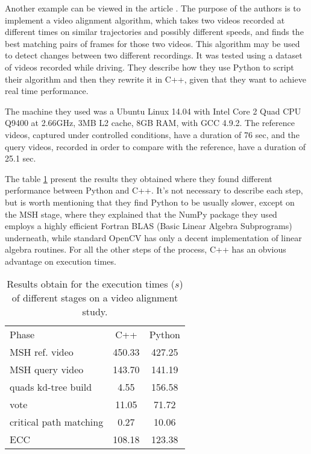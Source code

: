 \documentclass[10pt,letterpaper]{article}
\begin{document}
Another example can be viewed in the article \cite{Susu2016}. The purpose of the authors is to implement a video alignment algorithm, which takes two videos recorded at different times on similar trajectories and possibly different speeds, and finds the best matching pairs of frames for those two videos. This algorithm may be used to detect changes between two different recordings. It was tested using a dataset of videos recorded while driving. They describe how they use Python to script their algorithm and then they rewrite it in C++, given that they want to achieve real time performance.

The machine they used was a Ubuntu Linux 14.04 with Intel Core 2 Quad CPU Q9400 at 2.66GHz, 3MB L2 cache, 8GB RAM, with GCC 4.9.2. The reference videos, captured under controlled conditions, have a duration of 76 sec, and the query videos, recorded in order to compare with the reference, have a duration of 25.1 sec.

The table \ref{videotable} present the results they obtained where they found different performance between Python and C++. It's not necessary to describe each step, but is worth mentioning that they find Python to be usually slower, except on the MSH stage, where they explained that the NumPy package they used employs a highly efficient Fortran BLAS (Basic Linear Algebra Subprograms) underneath, while standard OpenCV has only a decent implementation of linear algebra routines. For all the other steps of the process, C++ has an obvious advantage on execution times.

\begin{table}
\centering
\begin{tabular}{@{}l|cc@{}} \toprule
	Phase & C++ & Python \\ \cmidrule(r){1-3}
	MSH ref. video & 450.33 & 427.25\\
	MSH query video & 143.70 & 141.19\\
	quads kd-tree build & 4.55 & 156.58\\
	vote & 11.05 & 71.72\\
	critical path matching & 0.27 & 10.06\\
	ECC & 108.18 & 123.38\\ \bottomrule
\end{tabular}
\caption{Results obtain for the execution times ($s$) of different stages on a video alignment study.}
\label{videotable}
\end{table}




\end{document}
